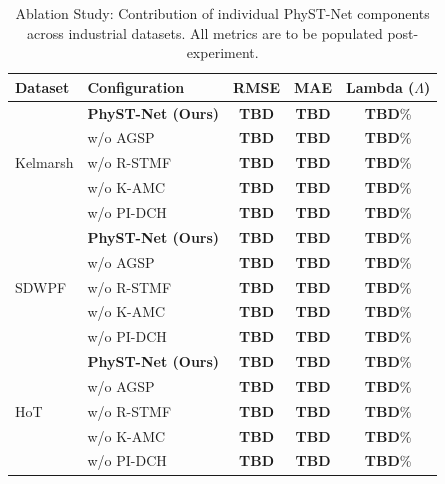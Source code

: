 \begin{table}[htbp]
\centering
\caption{Ablation Study: Contribution of individual PhyST-Net components across industrial datasets. All metrics are to be populated post-experiment.}
\label{tab:ablation_results}
\begin{tabular}{@{}llccc@{}}
\toprule
\textbf{Dataset} & \textbf{Configuration} & \textbf{RMSE} & \textbf{MAE} & \textbf{Lambda ($\Lambda$)} \\
\midrule
\multirow{5}{*}{Kelmarsh} & \textbf{PhyST-Net (Ours)} & \textbf{TBD} & \textbf{TBD} & \textbf{TBD}\% \\
 & w/o AGSP & \textbf{TBD} & \textbf{TBD} & \textbf{TBD}\% \\
 & w/o R-STMF & \textbf{TBD} & \textbf{TBD} & \textbf{TBD}\% \\
 & w/o K-AMC & \textbf{TBD} & \textbf{TBD} & \textbf{TBD}\% \\
 & w/o PI-DCH & \textbf{TBD} & \textbf{TBD} & \textbf{TBD}\% \\
\midrule
\multirow{5}{*}{SDWPF} & \textbf{PhyST-Net (Ours)} & \textbf{TBD} & \textbf{TBD} & \textbf{TBD}\% \\
 & w/o AGSP & \textbf{TBD} & \textbf{TBD} & \textbf{TBD}\% \\
 & w/o R-STMF & \textbf{TBD} & \textbf{TBD} & \textbf{TBD}\% \\
 & w/o K-AMC & \textbf{TBD} & \textbf{TBD} & \textbf{TBD}\% \\
 & w/o PI-DCH & \textbf{TBD} & \textbf{TBD} & \textbf{TBD}\% \\
\midrule
\multirow{5}{*}{HoT} & \textbf{PhyST-Net (Ours)} & \textbf{TBD} & \textbf{TBD} & \textbf{TBD}\% \\
 & w/o AGSP & \textbf{TBD} & \textbf{TBD} & \textbf{TBD}\% \\
 & w/o R-STMF & \textbf{TBD} & \textbf{TBD} & \textbf{TBD}\% \\
 & w/o K-AMC & \textbf{TBD} & \textbf{TBD} & \textbf{TBD}\% \\
 & w/o PI-DCH & \textbf{TBD} & \textbf{TBD} & \textbf{TBD}\% \\
\bottomrule
\end{tabular}
\end{table}
